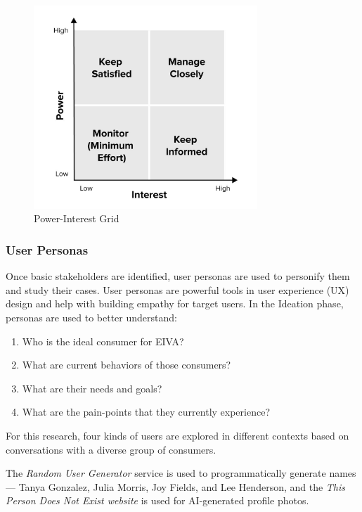 \documentclass{article}
\begin{document}
\begin{figure}[h]
 \centering
 \includegraphics[width=0.75\textwidth]{power-interest.jpg}
 \caption{Power-Interest Grid}
 \label{fig:checkbox}
\end{figure}

\subsubsection{User Personas}

Once basic stakeholders are identified, user personas are used to personify them and study their cases. User personas are powerful tools in user experience (UX) design and help with building empathy for target users. In the Ideation phase, personas are used to better understand:

\begin{enumerate}
	\item Who is the ideal consumer for EIVA?
	\item What are current behaviors of those consumers?
	\item What are their needs and goals?
	\item What are the pain-points that they currently experience?
\end{enumerate}

For this research, four kinds of users are explored in different contexts based on conversations with a diverse group of consumers.

The \emph{Random User Generator} service is used to programmatically generate names --- Tanya Gonzalez, Julia Morris, Joy Fields, and Lee Henderson, and the \emph{This Person Does Not Exist website} is used for AI-generated profile photos.
\end{document}
